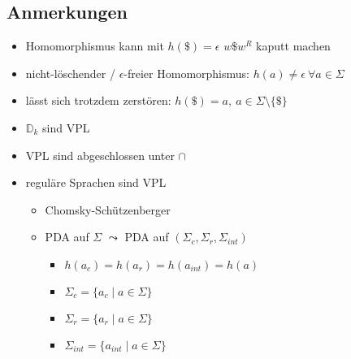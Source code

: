     \subsection{Anmerkungen}
    \begin{itemize}
        \item Homomorphismus kann mit $h(\$)=\epsilon$ $w\$ w^R$ kaputt machen
        \item nicht-löschender / $\epsilon$-freier Homomorphismus: $h(a)\not= \epsilon\ \forall a\in\Sigma$
        \item lässt sich trotzdem zerstören: $h(\$)=a,\ a\in\Sigma\setminus\{\$\}$
        \item $\mathds{D}_k$ sind VPL
        \item VPL sind abgeschlossen unter $\cap$
        \item reguläre Sprachen sind VPL
        \begin{itemize}
            \item Chomsky-Schützenberger
            \item PDA auf $\Sigma$ $\leadsto$ PDA auf $(\Sigma_c,\Sigma_r,\Sigma_{int})$
            \begin{itemize}
                \item $h(a_c)=h(a_r)=h(a_{int})=h(a)$
                \item $\Sigma_c=\{a_c\mid a\in\Sigma\}$
                \item $\Sigma_r=\{a_r\mid a\in\Sigma\}$
                \item $\Sigma_{int}=\{a_{int}\mid a\in\Sigma\}$
            \end{itemize}
        \end{itemize}
    \end{itemize}
